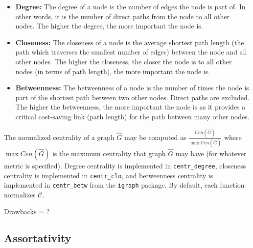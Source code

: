 \tablespacing
\begin{itemize}
	\item \textbf{Degree:} The degree of a node is the number of edges the node 
	is part of. In other words, it is the number of direct paths from the node 
	to all other nodes. The higher the degree, the more important the node 
	is.
	\item \textbf{Closeness:} The closeness of a node is the average 
	shortest path length (the path which traverses the smallest number of 
	edges) between the node and all other nodes. The higher the closeness, 
	the closer the node is to all other nodes (in terms of path length), the 
	more important the node is.
	\item \textbf{Betweenness:} The betweenness of a node is the number of 
	times the node is part of the shortest path between two other nodes. Direct 
	paths are excluded. The higher the betweenness, the more important the node 
	is as it provides a critical cost-saving link (path length) for the path 
	between many other nodes. 
\end{itemize}
\bodyspacing

The normalized centrality of a graph $\hat{G}$ may be computed as 	
$\frac{Cen(\hat{G})}{\max Cen(\hat{G})}$ where $\max Cen(\hat{G})$ is the 
maximum centrality that graph $\hat{G}$ may have (for whatever metric is 
specified). Degree centrality is implemented in \texttt{centr\_degree}, 
closeness centrality is implemented in \texttt{centr\_clo}, and betweenness 
centrality is implemented in \texttt{centr\_betw} from the \texttt{igraph} 
package. By default, each function normalizes $\mathcal{C}$.

Drawbacks = ?

\subsection{Assortativity}

